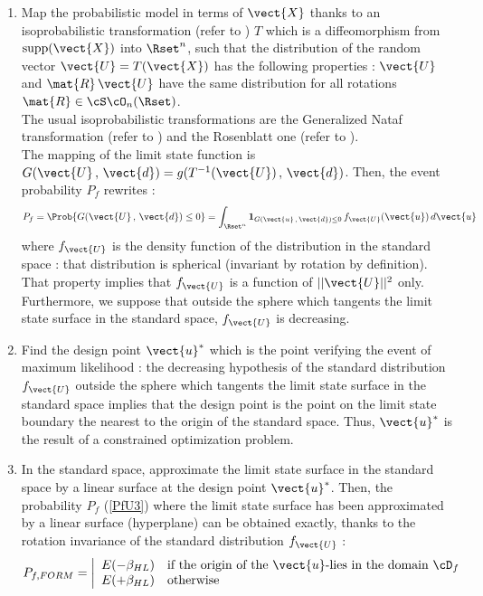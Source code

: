 {  \begin{enumerate}
  \item Map the probabilistic model in terms of $\vect{X}$ thanks to an isoprobabilistic transformation (refer to ) $T$ which is a diffeomorphism from $\supp(\vect{X})$ into $\Rset^n$, such that the distribution of the random vector $\vect{U}=T(\vect{X})$ has the following properties : $\vect{U}$ and $\mat{R}\,\vect{U}$ have the same distribution for all rotations $\mat{R}\in{\cS\cO}_n(\Rset)$.\\
    The usual isoprobabilistic transformations are the Generalized Nataf transformation (refer to ) and the Rosenblatt one (refer to ).\\
    The mapping of the limit state function is $G(\vect{U}\,,\,\vect{d}) =  g(T^{-1}(\vect{U})\,,\,\vect{d})$. Then, the event probability $P_f$ rewrites :
    \begin{equation}\label{PfU3}
      P_f = \Prob{G(\vect{U}\,,\,\vect{d})\leq 0} = \int_{\Rset^n} \boldsymbol{1}_{G(\vect{u}\,,\,\vect{d}) \leq 0}\,f_{\vect{U}}(\vect{u})\,d\vect{u}
    \end{equation}
    where $f_{\vect{U}}$ is the density function of the distribution in the standard space : that distribution is spherical (invariant by rotation by definition). That property implies that $f_{\vect{U}}$ is a function of $||\vect{U}||^2$ only. Furthermore, we suppose that outside the sphere which tangents the limit state surface in the standard space, $f_{\vect{U}}$ is decreasing.

  \item Find the design point $\vect{u}^*$ which is the point verifying the event of maximum likelihood : the decreasing hypothesis of the standard distribution $f_{\vect{U}}$ outside the sphere which tangents the limit state surface in the standard space implies that the design point is the point on the limit state boundary the nearest to the origin of the standard space. Thus, $\vect{u}^*$ is the result of a constrained optimization problem.

  \item In the standard space, approximate the limit state surface in the standard space by a linear surface at the design point $ \vect{u}^*$. Then, the probability $P_f$ (\ref{PfU3}) where the limit state surface has been approximated by a linear surface (hyperplane) can be obtained exactly, thanks to the rotation invariance of the standard distribution $f_{\vect{U}}$ :
    \begin{equation}\label{PfFORM}
      P_{f,FORM}        =
      \left|
      \begin{array}{ll}
        E(-\beta_{HL}) & \mbox{if the origin of the $\vect{u}$-lies in the domain $\cD_f$} \\
        E(+\beta_{HL}) & \mbox{otherwise}
      \end{array}
      \right.
    \end{equation}


\end{enumerate}}
